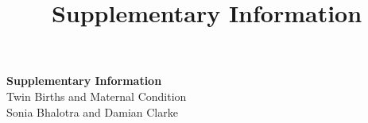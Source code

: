\documentclass[12pt]{article}
\title{Supplementary Information}
\author{}
\date{}
\begin{document}
\baselineskip24pt

\begin{center}
  {\Large \textbf{Supplementary Information}}  \\
  Twin Births and Maternal Condition \\
  Sonia Bhalotra and Damian Clarke
\end{center}



\end{document}
